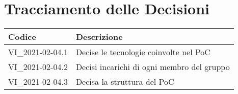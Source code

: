 \section*{Tracciamento delle Decisioni}

\begin{center}
	\begin{longtable}{|p{3.5cm}|p{11cm}|}
		\hline
		\rowcolor{lighter-grayer}
		\textbf{Codice} & \textbf{Descrizione} \\
		\hline
		\endfirsthead

		\hline
		VI\_2021-02-04.1 & Decise le tecnologie coinvolte nel PoC \\
		VI\_2021-02-04.2 & Decisi incarichi di ogni membro del gruppo \\
		VI\_2021-02-04.3 & Decisa la struttura del PoC \\
		\hline
	\end{longtable}
\end{center}